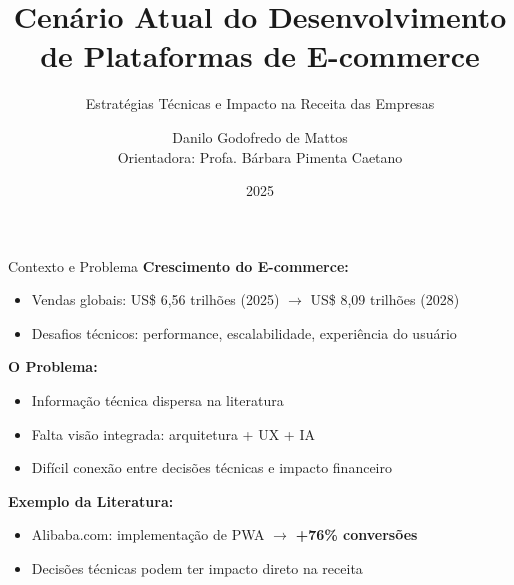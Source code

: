 \documentclass{beamer}
\title{Cenário Atual do Desenvolvimento de Plataformas de E-commerce}
\subtitle{Estratégias Técnicas e Impacto na Receita das Empresas}
\author{Danilo Godofredo de Mattos\\Orientadora: Profa. Bárbara Pimenta Caetano}
\date{2025}
\begin{document}
    \maketitle


    \begin{frame}{Contexto e Problema}
        \textbf{Crescimento do E-commerce:}
        \begin{itemize}
            \item Vendas globais: US\$ 6,56 trilhões (2025) $\rightarrow$ US\$ 8,09 trilhões (2028)
            \item Desafios técnicos: performance, escalabilidade, experiência do usuário
        \end{itemize}

        \vspace{0.4cm}

        \textbf{O Problema:}
        \begin{itemize}
            \item Informação técnica dispersa na literatura
            \item Falta visão integrada: arquitetura + UX + IA
            \item Difícil conexão entre decisões técnicas e impacto financeiro
        \end{itemize}

        \vspace{0.4cm}

        \textbf{Exemplo da Literatura:}
        \begin{itemize}
            \item Alibaba.com: implementação de PWA $\rightarrow$ \textbf{+76\% conversões}
            \item Decisões técnicas podem ter impacto direto na receita
        \end{itemize}
    \end{frame}
\end{document}
